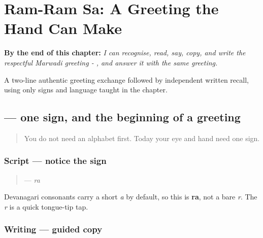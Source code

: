 
\chapter{Ram-Ram Sa: A Greeting the Hand Can Make}
\label{ch:mw-ram-ram-sa}

\begin{chapteropening}
\textbf{By the end of this chapter:} \emph{I can recognise, read, say, copy, and write the respectful Marwadi greeting - , and answer it with the same greeting.}

A two-line authentic greeting exchange followed by independent written recall, using only signs and language taught in the chapter.
\end{chapteropening}

\section[\texorpdfstring{\mw{र} (ra)}{र (ra)}]{ — one sign, and the beginning of a greeting}

\label{lesson:MW-W01-ra}



\begin{quote}
You do not need an alphabet first. Today your eye and hand need one sign.
\end{quote}

\subsection*{Script — notice the sign}
\begin{quote}
\textbf{} — \emph{ra}
\end{quote}

Devanagari consonants carry a short \emph{a} by default, so this is \textbf{ra}, not a bare \emph{r}. The \emph{r} is a quick tongue-tip tap.

\subsection*{Writing — guided copy}

